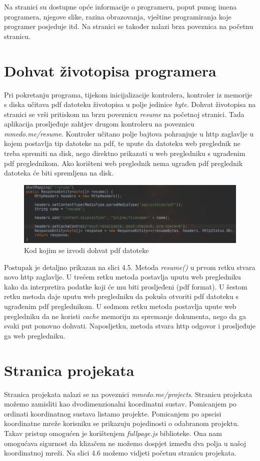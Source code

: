 \documentclass[times, utf8, zavrsni, numeric]{fer}
\begin{document}
Na stranici su dostupne opće informacije o programeru, poput punog imena programera, njegove slike, razina obrazovanja, vještine programiranja koje programer posjeduje itd.
Na stranici se također nalazi brza poveznica na početnu stranicu.

\section{Dohvat životopisa programera}
\qquad Pri pokretanju programa, tijekom inicijalizacije kontrolera, kontroler iz memorije s diska učitava pdf datoteku životopisa u polje jedinice \textit{byte}.
Dohvat životopisa na stranici se vrši pritiskom na brzu poveznicu \textit{resume} na početnoj stranici.
Tada aplikacija prosljeđuje zahtjev drugom kontroleru na poveznicu \textit{mmedo.me/resume}. 
Kontroler učitano polje bajtova pohranjuje u http zaglavlje u kojem postavlja tip datoteke na pdf, te upute da datoteku web preglednik ne treba spremiti na disk, nego direktno prikazati u web pregledniku s ugrađenim pdf preglednikom.
Ako korišteni web preglednik nema ugrađen pdf preglednik datoteka će biti spremljena na disk.

\begin{figure}[htb]
				\centering
				\includegraphics[width=14.6cm]{images/resume.png}
				\caption{Kod kojim se izvodi dohvat pdf datoteke}
				\label{fig:resume}
\end{figure}

\qquad Postupak je detaljno prikazan na slici 4.5.
Metoda \textit{resume()} u prvom retku stvara novo http zaglavlje.
U trećem retku metoda postavlja uputu web pregledniku kako da interpretira podatke koji će mu biti prosljeđeni (pdf format).
U šestom retku metoda daje uputu web pregledniku da pokuša otvoriti pdf datoteku s ugrađenim pdf preglednikom.
U sedmom retku metoda postavlja upute web pregledniku da ne koristi \textit{cache} memoriju za spremanje dokumenta, nego da ga svaki put ponovno dohvati.
Naposljetku, metoda stvara http odgovor i prosljeđuje ga web pregledniku.

\section{Stranica projekata}
\qquad Stranica projekata nalazi se na poveznici \textit{mmedo.me/projects}.
Stranicu projekata možemo zamisliti kao dvodimenzionalni koordinatni sustav.
Pomicanjem po ordinati koordinatnog sustava listamo projekte.
Pomicanjem po apscisi koordinatne mreže korisniku se prikazuju pojedinosti o odabranom projektu.
Takav pristup omogućen je korištenjem \textit{fullpage.js} biblioteke.
Ona nam omogućava sigurnost da klizačem ne možemo dospjet između dva polja u našoj koordinatnoj mreži.
Na slici 4.6 možemo vidjeti početnu stranicu projekata.
\end{document}
